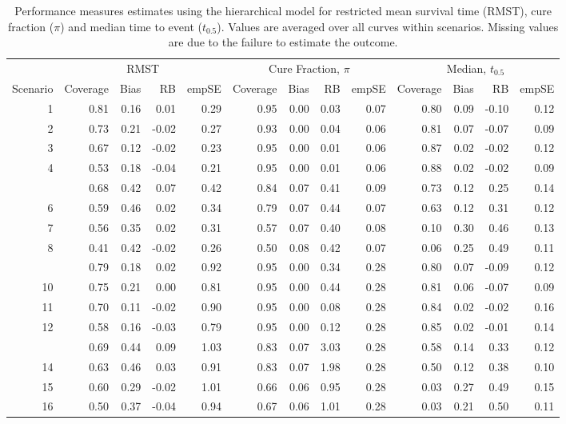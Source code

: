 \documentclass[AMA,STIX1COL]{WileyNJD-v2}
\begin{document}
\begin{table}[h!]
\centering
\begin{tabular}{rrrrrrrrrrrrr}
\toprule
\multicolumn{1}{c}{ } & \multicolumn{4}{c}{RMST} & \multicolumn{4}{c}{Cure Fraction, $\pi$} & \multicolumn{4}{c}{Median, $t_{0.5}$} \\
\cmidrule(l{3pt}r{3pt}){2-5} \cmidrule(l{3pt}r{3pt}){6-9} \cmidrule(l{3pt}r{3pt}){10-13}
Scenario & Coverage & Bias & RB & empSE & Coverage & Bias & RB & empSE & Coverage & Bias & RB & empSE\\
\midrule
1 & 0.81 & 0.16 & 0.01 & 0.29 & 0.95 & 0.00 & 0.03 & 0.07 & 0.80 & 0.09 & -0.10 & 0.12\\
2 & 0.73 & 0.21 & -0.02 & 0.27 & 0.93 & 0.00 & 0.04 & 0.06 & 0.81 & 0.07 & -0.07 & 0.09\\
3 & 0.67 & 0.12 & -0.02 & 0.23 & 0.95 & 0.00 & 0.01 & 0.06 & 0.87 & 0.02 & -0.02 & 0.12\\
4 & 0.53 & 0.18 & -0.04 & 0.21 & 0.95 & 0.00 & 0.01 & 0.06 & 0.88 & 0.02 & -0.02 & 0.09\\
\addlinespace
5 & 0.68 & 0.42 & 0.07 & 0.42 & 0.84 & 0.07 & 0.41 & 0.09 & 0.73 & 0.12 & 0.25 & 0.14\\
6 & 0.59 & 0.46 & 0.02 & 0.34 & 0.79 & 0.07 & 0.44 & 0.07 & 0.63 & 0.12 & 0.31 & 0.12\\
7 & 0.56 & 0.35 & 0.02 & 0.31 & 0.57 & 0.07 & 0.40 & 0.08 & 0.10 & 0.30 & 0.46 & 0.13\\
8 & 0.41 & 0.42 & -0.02 & 0.26 & 0.50 & 0.08 & 0.42 & 0.07 & 0.06 & 0.25 & 0.49 & 0.11\\
\addlinespace
9 & 0.79 & 0.18 & 0.02 & 0.92 & 0.95 & 0.00 & 0.34 & 0.28 & 0.80 & 0.07 & -0.09 & 0.12\\
10 & 0.75 & 0.21 & 0.00 & 0.81 & 0.95 & 0.00 & 0.44 & 0.28 & 0.81 & 0.06 & -0.07 & 0.09\\
11 & 0.70 & 0.11 & -0.02 & 0.90 & 0.95 & 0.00 & 0.08 & 0.28 & 0.84 & 0.02 & -0.02 & 0.16\\
12 & 0.58 & 0.16 & -0.03 & 0.79 & 0.95 & 0.00 & 0.12 & 0.28 & 0.85 & 0.02 & -0.01 & 0.14\\
\addlinespace
13 & 0.69 & 0.44 & 0.09 & 1.03 & 0.83 & 0.07 & 3.03 & 0.28 & 0.58 & 0.14 & 0.33 & 0.12\\
14 & 0.63 & 0.46 & 0.03 & 0.91 & 0.83 & 0.07 & 1.98 & 0.28 & 0.50 & 0.12 & 0.38 & 0.10\\
15 & 0.60 & 0.29 & -0.02 & 1.01 & 0.66 & 0.06 & 0.95 & 0.28 & 0.03 & 0.27 & 0.49 & 0.15\\
16 & 0.50 & 0.37 & -0.04 & 0.94 & 0.67 & 0.06 & 1.01 & 0.28 & 0.03 & 0.21 & 0.50 & 0.11\\
\bottomrule
\end{tabular}
\caption{Performance measures estimates using the hierarchical model for restricted mean survival time (RMST), cure fraction ($\pi$) and median time to event ($t_{0.5}$). Values are averaged over all curves within scenarios. Missing values are due to the failure to estimate the outcome.}
\label{tab:performance_measures}
\end{table}
\end{document}

